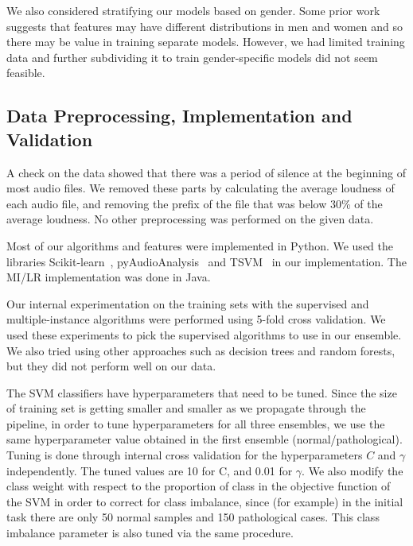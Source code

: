 We also considered stratifying our models based on gender. Some prior work~\cite{b9} suggests that features may have different distributions in men and women and so there may be value in training separate models. However, we had limited training data and further subdividing it to train gender-specific models did not seem feasible.

\subsection{Data Preprocessing, Implementation and Validation}
A check on the data showed that there was a period of silence at the beginning of most audio files. We removed these parts by calculating the average loudness of each audio file, and removing the prefix of the file that was below  30\% of the average loudness. No other preprocessing was performed on the given data.

Most of our algorithms and features were implemented in Python. We used the libraries Scikit-learn~\cite{b17}, pyAudioAnalysis~\cite{b6} and TSVM~\cite{b23} in our implementation. The MI/LR implementation was done in Java.

Our internal experimentation on the training sets with the supervised and multiple-instance algorithms were performed using 5-fold cross validation. We used these experiments to pick the supervised algorithms to use in our ensemble. We also tried using other approaches such as decision trees and random forests, but they did not perform well on our data.

The SVM classifiers have hyperparameters that need to be tuned. Since the size of training set is getting smaller and smaller as we propagate through the pipeline, in order to tune hyperparameters for all three ensembles, we use the same hyperparameter value obtained in the first ensemble (normal/pathological). Tuning is done through internal cross validation for the hyperparameters $C$ and $\gamma$ independently. The tuned values are 10 for C, and 0.01 for $\gamma$. We also modify the class weight with respect to the proportion of class in the objective function of the SVM in order to correct for class imbalance, since (for example) in the initial task there are only 50 normal samples and 150 pathological cases. This class imbalance parameter is also tuned via the same procedure. 

